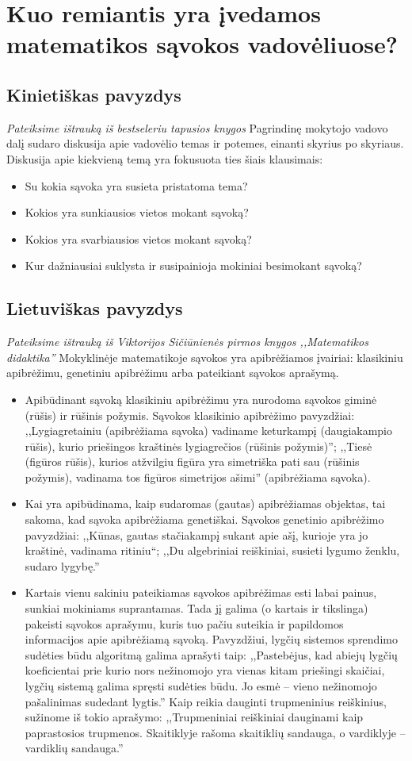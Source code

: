 \documentclass{article}
\begin{document}
\section{Kuo remiantis yra įvedamos matematikos sąvokos vadovėliuose?}
\subsection{Kinietiškas pavyzdys}
\textit{Pateiksime ištrauką iš bestseleriu tapusios knygos}
Pagrindinę mokytojo vadovo dalį sudaro diskusija apie vadovėlio temas ir potemes, einanti skyrius po skyriaus. Diskusija apie kiekvieną temą yra fokusuota ties šiais klausimais:
\begin{itemize}
\item Su kokia sąvoka yra susieta pristatoma tema?
\item Kokios yra sunkiausios vietos mokant sąvoką?
\item Kokios yra svarbiausios vietos mokant sąvoką?
\item Kur dažniausiai suklysta ir susipainioja mokiniai besimokant sąvoką?
\end{itemize}
\subsection{Lietuviškas pavyzdys}
\textit{Pateiksime ištrauką iš Viktorijos Sičiūnienės pirmos knygos ,,Matematikos didaktika''}
Mokyklinėje matematikoje sąvokos yra apibrėžiamos įvairiai: klasikiniu apibrėžimu, genetiniu apibrėžimu arba pateikiant sąvokos aprašymą.
\begin{itemize}
\item Apibūdinant sąvoką klasikiniu apibrėžimu yra nurodoma sąvokos giminė (rūšis) ir
rūšinis požymis. Sąvokos klasikinio apibrėžimo pavyzdžiai: ,,Lygiagretainiu (apibrėžiama sąvoka) vadiname keturkampį (daugiakampio rūšis), kurio priešingos kraštinės lygiagrečios (rūšinis požymis)''; ,,Tiesė (figūros rūšis), kurios atžvilgiu figūra yra simetriška
pati sau (rūšinis požymis), vadinama tos figūros simetrijos ašimi'' (apibrėžiama sąvoka).
\item Kai yra apibūdinama, kaip sudaromas (gautas) apibrėžiamas objektas, tai sakoma,
kad sąvoka apibrėžiama genetiškai. Sąvokos genetinio apibrėžimo pavyzdžiai: ,,Kūnas,
gautas stačiakampį sukant apie ašį, kurioje yra jo kraštinė, vadinama ritiniu“; ,,Du algebriniai reiškiniai, susieti lygumo ženklu, sudaro lygybę.''
\item Kartais vienu sakiniu pateikiamas sąvokos apibrėžimas esti labai painus, sunkiai
mokiniams suprantamas. Tada jį galima (o kartais ir tikslinga) pakeisti sąvokos aprašymu, kuris tuo pačiu suteikia ir papildomos informacijos apie apibrėžiamą sąvoką.
Pavyzdžiui, lygčių sistemos sprendimo sudėties būdu algoritmą galima aprašyti taip:
,,Pastebėjus, kad abiejų lygčių koeficientai prie kurio nors nežinomojo yra vienas kitam
priešingi skaičiai, lygčių sistemą galima spręsti sudėties būdu. Jo esmė – vieno nežinomojo pašalinimas sudedant lygtis.''  Kaip reikia dauginti trupmeninius reiškinius, sužinome iš tokio aprašymo: ,,Trupmeniniai reiškiniai dauginami kaip paprastosios trupmenos. Skaitiklyje rašoma skaitiklių sandauga, o vardiklyje – vardiklių sandauga.''
\end{itemize}
\end{document}

